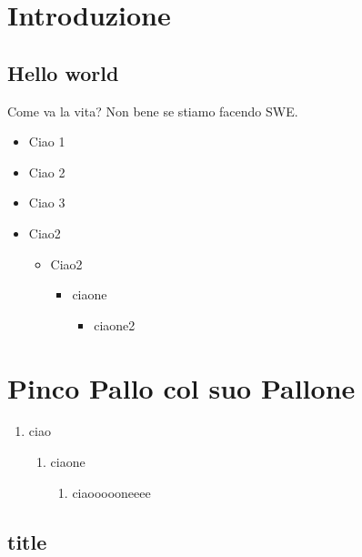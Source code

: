 \section{Introduzione}

\subsection{Hello world}

Come va la vita? Non bene se stiamo facendo SWE.

\begin{itemize}
	\item Ciao 1
	\item Ciao 2
	\item Ciao 3
\end{itemize}

\lipsum[3-5]


\begin{itemize}
	\item Ciao2
	\begin{itemize}
		\item Ciao2
		\begin{itemize}
			\item ciaone
			\begin{itemize}
				\item ciaone2
			\end{itemize}
		\end{itemize}
	\end{itemize}
\end{itemize}


\section{Pinco Pallo col suo Pallone}

\begin{enumerate}
	\item ciao
	\begin{enumerate}
		\item ciaone
		\begin{enumerate}
			\item ciaoooooneeee
		\end{enumerate}
	\end{enumerate}
\end{enumerate}

\subsection{title}

